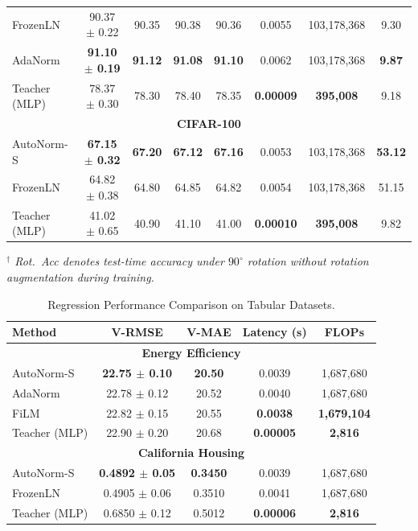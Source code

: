 \documentclass[conference]{IEEEtran}
\begin{document}
\begin{table}[t]
{\begin{tabular}{lccccccc}
FrozenLN            & 90.37 $\pm$ 0.22 & 90.35 & 90.38 & 90.36 & 0.0055 & 103{,}178{,}368 & 9.30 \\
AdaNorm             & \textbf{91.10 $\pm$ 0.19} & \textbf{91.12} & \textbf{91.08} & \textbf{91.10} & 0.0062 & 103{,}178{,}368 & \textbf{9.87} \\
Teacher (MLP)       & 78.37 $\pm$ 0.30 & 78.30 & 78.40 & 78.35 & \textbf{0.00009} & \textbf{395{,}008} & 9.18 \\
\midrule
\multicolumn{8}{c}{\textbf{CIFAR-100}} \\
\midrule
AutoNorm-S          & \textbf{67.15 $\pm$ 0.32} & \textbf{67.20} & \textbf{67.12} & \textbf{67.16} & 0.0053 & 103{,}178{,}368 & \textbf{53.12} \\

FrozenLN            & 64.82 $\pm$ 0.38 & 64.80 & 64.85 & 64.82 & 0.0054 & 103{,}178{,}368 & 51.15 \\
Teacher (MLP)       & 41.02 $\pm$ 0.65 & 40.90 & 41.10 & 41.00 & \textbf{0.00010} & \textbf{395{,}008} & 9.82 \\
\bottomrule
\end{tabular}}
\textit{$^\dagger$ Rot.\ Acc denotes test-time accuracy under 
$90^\circ$ rotation without rotation augmentation during training.}
\end{table}

\begin{table}[htbp]
\centering
\caption{Regression Performance Comparison on Tabular Datasets.}
\label{tab:regression_results}
\begin{tabular}{lcccc}
\toprule
\textbf{Method} & \textbf{V-RMSE} & \textbf{V-MAE} & \textbf{Latency (s)} & \textbf{FLOPs} \\
\midrule
\multicolumn{5}{c}{\textbf{Energy Efficiency}} \\
\midrule
AutoNorm-S    & \textbf{22.75 $\pm$ 0.10} & \textbf{20.50} & 0.0039 & 1{,}687{,}680 \\
AdaNorm       & 22.78 $\pm$ 0.12 & 20.52 & 0.0040 & 1{,}687{,}680 \\
FiLM          & 22.82 $\pm$ 0.15 & 20.55 & \textbf{0.0038} & \textbf{1{,}679{,}104} \\
Teacher (MLP) & 22.90 $\pm$ 0.20 & 20.68 & \textbf{0.00005} & \textbf{2{,}816} \\
\midrule
\multicolumn{5}{c}{\textbf{California Housing}} \\
\midrule
AutoNorm-S    & \textbf{0.4892 $\pm$ 0.05} & \textbf{0.3450} & 0.0039 & 1{,}687{,}680 \\
FrozenLN      & 0.4905 $\pm$ 0.06 & 0.3510 & 0.0041 & 1{,}687{,}680 \\
Teacher (MLP) & 0.6850 $\pm$ 0.12 & 0.5012 & \textbf{0.00006} & \textbf{2{,}816} \\
\bottomrule
\end{tabular}
\end{table}
\end{document}
